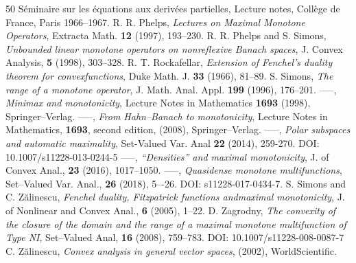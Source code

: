 \documentclass[letterpaper]{article}
\theoremstyle{plain}
\theoremstyle{definition}
\numberwithin{equation}{section}
\begin{document}
\begin{thebibliography}{50}
S\'eminaire sur les \'equations aux deriv\'ees partielles, Lecture
notes, Coll\`ege de France, Paris 1966--1967.
%
%
R. R. Phelps, {\em Lectures on Maximal Monotone
Operators}, Extracta Math. {\bf 12} (1997), 193--230.
%
R. R. Phelps and S. Simons, {\em Unbounded linear monotone operators on nonreflexive Banach spaces}, J. Convex Analysis, {\bf 5} (1998), 303--328.
%
R. T. Rockafellar, {\em Extension of Fenchel's duality theorem for convex\break functions}, Duke Math. J. {\bf33} (1966), 81--89.
%
S. Simons, {\em The range of a monotone operator}, J. Math. Anal. Appl. {\bf 199} (1996), 176--201.
%
-----, {\em Minimax and monotonicity}, 
Lecture Notes in Mathematics {\bf 1693} (1998), Springer--Verlag.
%
%
-----, {\em From Hahn--Banach to monotonicity}, 
Lecture Notes in Mathematics, {\bf 1693}, second edition, (2008), Springer--Verlag.
%
-----, {\em Polar subspaces and automatic maximality}, Set-Valued Var. Anal {\bf 22} (2014), 259-270. DOI: 10.1007/s11228-013-0244-5
%
%
-----, {\em ``Densities'' and maximal monotonicity}, J. of Convex Anal., {\bf 23} (2016), 1017--1050.
%
-----, {\em Quasidense monotone multifunctions}, Set--Valued Var. Anal., {\bf 26} (2018),  5–-26. DOI: s11228-017-0434-7. 
%
%
S. Simons and C. Z\u{a}linescu, {\em Fenchel duality, Fitzpatrick functions and\break maximal monotonicity}, J. of Nonlinear and  Convex Anal., {\bf 6} (2005), 1--22.
%
D. Zagrodny, {\em The convexity of the closure of the domain and the range of a maximal monotone multifunction of Type NI}, Set--Valued Anal, {\bf 16} (2008), 759--783.   DOI: 10.1007/s11228-008-0087-7
%
 C. Z\u{a}linescu, {\em Convex analysis in general vector spaces}, (2002), World\break Scientific.
\end{thebibliography}
\end{document}
